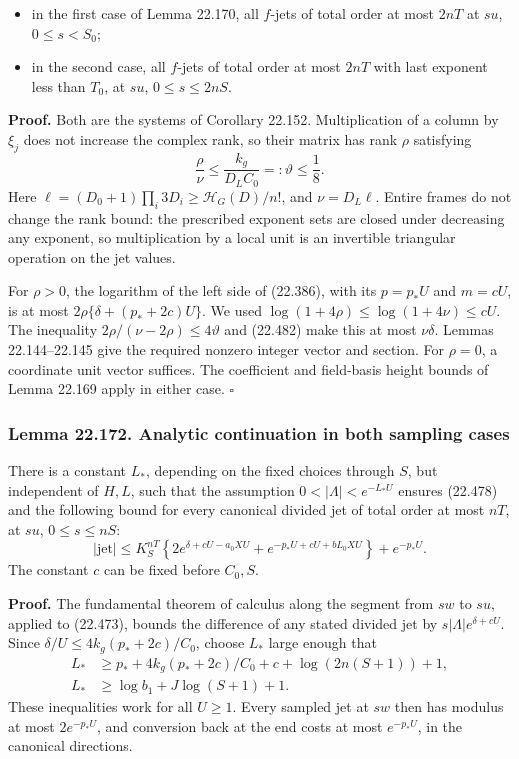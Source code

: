 \documentclass[
  11pt,
  a4paper,
]{article}
\providecommand{\tightlist}{%
  \setlength{\itemsep}{0pt}\setlength{\parskip}{0pt}}
\begin{document}
\begin{itemize}
\tightlist
\item
  in the first case of Lemma 22.170, all \(f\)-jets of total order at
  most \(2nT\) at \(su\), \(0\le s<S_0\);
\item
  in the second case, all \(f\)-jets of total order at most \(2nT\) with
  last exponent less than \(T_0\), at \(su\), \(0\le s\le2nS\).
\end{itemize}

\textbf{Proof.} Both are the systems of Corollary 22.152. Multiplication
of a column by \(\xi_j\) does not increase the complex rank, so their
matrix has rank \(\rho\) satisfying \[
 \frac\rho\nu\le\frac{k_g}{D_L C_0}=:\vartheta\le\frac18.
 \tag{22.483}
\] Here \(\ell=(D_0+1)\prod_i3D_i\ge
\mathcal H_G(D)/n!\), and \(\nu=D_L\ell\). Entire frames do not change
the rank bound: the prescribed exponent sets are closed under decreasing
any exponent, so multiplication by a local unit is an invertible
triangular operation on the jet values.

For \(\rho>0\), the logarithm of the left side of (22.386), with its
\(p=p_*U\) and \(m=cU\), is at most \(2\rho\{\delta+(p_*+2c)U\}\). We
used \(\log(1+4\rho)\le\log(1+4\nu)\le cU\). The inequality
\(2\rho/(\nu-2\rho)\le4\vartheta\) and (22.482) make this at most
\(\nu\delta\). Lemmas 22.144--22.145 give the required nonzero integer
vector and section. For \(\rho=0\), a coordinate unit vector suffices.
The coefficient and field-basis height bounds of Lemma 22.169 apply in
either case. \(\square\)

\subsubsection{Lemma 22.172. Analytic continuation in both sampling
cases}\label{lemma-22.172.-analytic-continuation-in-both-sampling-cases}

There is a constant \(L_*\), depending on the fixed choices through
\(S\), but independent of \(H,L\), such that the assumption
\(0<|\Lambda|<e^{-L_*U}\) ensures (22.478) and the following bound for
every canonical divided jet of total order at most \(nT\), at \(su\),
\(0\le s\le nS\): \[
 |\text{jet}|\le K_S^{nT}
 \left\{2e^{\delta+cU-a_0XU}
              +e^{-p_*U+cU+bL_0XU}\right\}+e^{-p_*U}.
 \tag{22.484}
\] The constant \(c\) can be fixed before \(C_0,S\).

\textbf{Proof.} The fundamental theorem of calculus along the segment
from \(sw\) to \(su\), applied to (22.473), bounds the difference of any
stated divided jet by \(s|\Lambda|e^{\delta+cU}\). Since
\(\delta/U\le4k_g(p_*+2c)/C_0\), choose \(L_*\) large enough that \[
\begin{split}
 L_*&\ge p_*+4k_g(p_*+2c)/C_0+c
                         +\log(2n(S+1))+1,\\
 L_*&\ge\log b_1+J\log(S+1)+1.
\end{split}
\tag{22.485}
\] These inequalities work for all \(U\ge1\). Every sampled jet at
\(sw\) then has modulus at most \(2e^{-p_*U}\), and conversion back at
the end costs at most \(e^{-p_*U}\), in the canonical directions.
\end{document}
